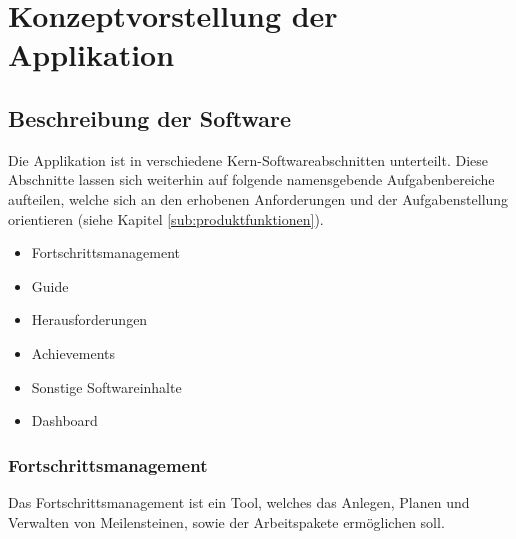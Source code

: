 \documentclass{scrreprt}
\begin{document}
\chapter{Konzeptvorstellung der Applikation} \label{chap:konzept}

\section{Beschreibung der Software}
\par Die Applikation ist in verschiedene Kern-Softwareabschnitten unterteilt. Diese Abschnitte lassen sich weiterhin auf folgende namensgebende Aufgabenbereiche aufteilen, welche sich an den erhobenen Anforderungen und der Aufgabenstellung orientieren (siehe Kapitel \ref{sub:produktfunktionen}).

\begin{itemize}
\item Fortschrittsmanagement
\item Guide
\item Herausforderungen
\item Achievements
\item Sonstige Softwareinhalte
\item Dashboard
\end{itemize}

\newpage
\subsection{Fortschrittsmanagement}
\par Das Fortschrittsmanagement ist ein Tool, welches das Anlegen, Planen und Verwalten von Meilensteinen, sowie der Arbeitspakete ermöglichen soll. 
\end{document}
